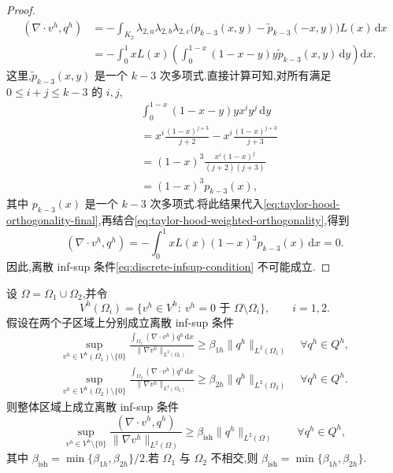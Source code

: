 \begin{proof}
\begin{equation}\label{eq:taylor-hood-orthogonality-final}
\begin{aligned}
  (\nabla\cdot v^h,q^h)
  &=-\int_{K_2}\lambda_{2,a}\lambda_{2,b}\lambda_{2,c}
       \bigl(p_{k-3}(x,y)-\widetilde p_{k-3}(-x,y)\bigr)L(x)\,\mathrm{d}x\\
  &=-\int_0^1xL(x)
       \left(\int_0^{1-x}(1-x-y)y\widetilde p_{k-3}(x,y)\,\mathrm{d}y\right)
       \mathrm{d}x.
\end{aligned}
\end{equation}
这里,$\widetilde p_{k-3}(x,y)$ 是一个 $k-3$ 次多项式.直接计算可知,对所有满足 $0\le i+j\le k-3$ 的 $i,j$,
\[
\begin{aligned}
  &\int_0^{1-x}(1-x-y)y x^iy^j\,\mathrm{d}y\\
  &=x^i\frac{(1-x)^{j+3}}{j+2}
       -x^i\frac{(1-x)^{j+3}}{j+3}\\
  &=(1-x)^3\frac{x^i(1-x)^j}{(j+2)(j+3)}\\
  &=(1-x)^3p_{k-3}(x),
\end{aligned}
\]
其中 $p_{k-3}(x)$ 是一个 $k-3$ 次多项式.将此结果代入\cref{eq:taylor-hood-orthogonality-final},再结合\cref{eq:taylor-hood-weighted-orthogonality},得到
\[
  (\nabla\cdot v^h,q^h)
  =-\int_0^1xL(x)(1-x)^3p_{k-3}(x)\,\mathrm{d}x=0.
\]
因此,离散 inf-sup 条件\cref{eq:discrete-infsup-condition} 不可能成立.
\end{proof}

\begin{lemma}[区域分解]\label{lem:domain-decomposition-infsup}
设 $\Omega=\Omega_1\cup\Omega_2$,并令
\[
  V^h(\Omega_i)=\{v^h\in V^h:\ v^h=0\text{ 于 }\Omega\setminus\Omega_i\},
  \qquad i=1,2.
\]
假设在两个子区域上分别成立离散 inf-sup 条件
\[
\begin{aligned}
  \sup_{v^h\in V^h(\Omega_1)\setminus\{0\}}
  \frac{\displaystyle\int_{\Omega_1}(\nabla\cdot v^h)q^h\,\mathrm{d}x}
       {\|\nabla v^h\|_{L^2(\Omega_1)}}
  \ge \beta_{1h}\|q^h\|_{L^2(\Omega_1)}
  \quad\forall q^h\in Q^h,\\
  \sup_{v^h\in V^h(\Omega_2)\setminus\{0\}}
  \frac{\displaystyle\int_{\Omega_2}(\nabla\cdot v^h)q^h\,\mathrm{d}x}
       {\|\nabla v^h\|_{L^2(\Omega_2)}}
  \ge \beta_{2h}\|q^h\|_{L^2(\Omega_2)}
  \quad\forall q^h\in Q^h.
\end{aligned}
\]
则整体区域上成立离散 inf-sup 条件
\begin{equation}\label{eq:domain-decomposition-global-infsup}
  \sup_{v^h\in V^h\setminus\{0\}}
  \frac{(\nabla\cdot v^h,q^h)}{\|\nabla v^h\|_{L^2(\Omega)}}
  \ge \beta_{\mathrm{ish}}\|q^h\|_{L^2(\Omega)}
  \qquad\forall q^h\in Q^h,
\end{equation}
其中 $\beta_{\mathrm{ish}}=\min\{\beta_{1h},\beta_{2h}\}/2$.若 $\Omega_1$ 与 $\Omega_2$ 不相交,则 $\beta_{\mathrm{ish}}=\min\{\beta_{1h},\beta_{2h}\}$.
\end{lemma}

